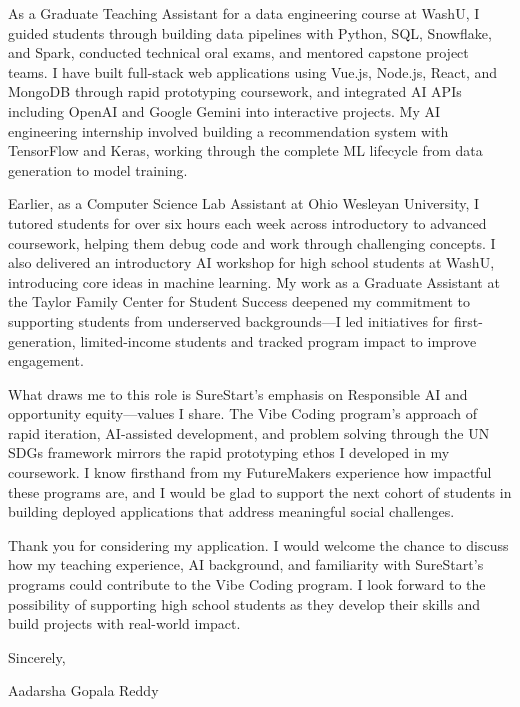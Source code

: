\documentclass[10pt, letterpaper]{article}
\begin{document}
\vspace{\headerSpacing}
\begin{onecolentry}
	As a Graduate Teaching Assistant for a data engineering course at WashU, I guided students through building data pipelines with Python, SQL, Snowflake, and Spark, conducted technical oral exams, and mentored capstone project teams. I have built full-stack web applications using Vue.js, Node.js, React, and MongoDB through rapid prototyping coursework, and integrated AI APIs including OpenAI and Google Gemini into interactive projects. My AI engineering internship involved building a recommendation system with TensorFlow and Keras, working through the complete ML lifecycle from data generation to model training.
\end{onecolentry}

\vspace{\headerSpacing}
\begin{onecolentry}
	Earlier, as a Computer Science Lab Assistant at Ohio Wesleyan University, I tutored students for over six hours each week across introductory to advanced coursework, helping them debug code and work through challenging concepts. I also delivered an introductory AI workshop for high school students at WashU, introducing core ideas in machine learning. My work as a Graduate Assistant at the Taylor Family Center for Student Success deepened my commitment to supporting students from underserved backgrounds---I led initiatives for first-generation, limited-income students and tracked program impact to improve engagement.
\end{onecolentry}

\vspace{\headerSpacing}
\begin{onecolentry}
	What draws me to this role is SureStart's emphasis on Responsible AI and opportunity equity---values I share. The Vibe Coding program's approach of rapid iteration, AI-assisted development, and problem solving through the UN SDGs framework mirrors the rapid prototyping ethos I developed in my coursework. I know firsthand from my FutureMakers experience how impactful these programs are, and I would be glad to support the next cohort of students in building deployed applications that address meaningful social challenges.
\end{onecolentry}

\vspace{\headerSpacing}
\begin{onecolentry}
	Thank you for considering my application. I would welcome the chance to discuss how my teaching experience, AI background, and familiarity with SureStart's programs could contribute to the Vibe Coding program. I look forward to the possibility of supporting high school students as they develop their skills and build projects with real-world impact.
\end{onecolentry}

\vspace{\headerSpacing}
\begin{onecolentry}
	Sincerely,
\end{onecolentry}

\vspace{\headerSpacing}
\begin{onecolentry}
	Aadarsha Gopala Reddy\\
\end{onecolentry}
\end{document}
